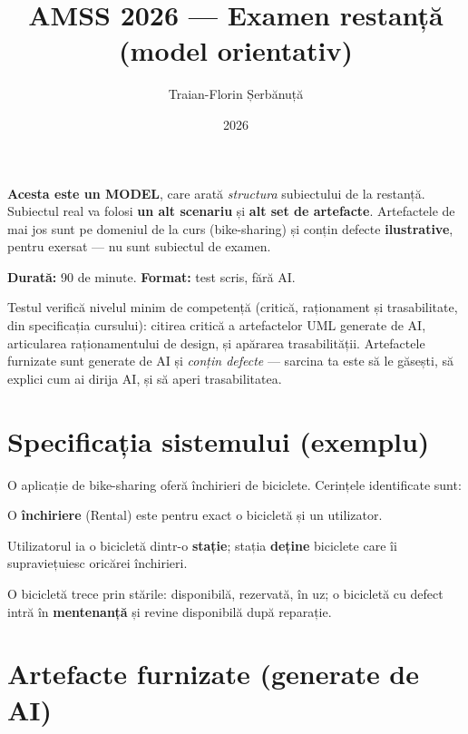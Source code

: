 \documentclass[12pt,a4paper]{article}
\title{AMSS 2026 — Examen restanță \\ \large (model orientativ)}
\author{Traian-Florin Șerbănuță}
\date{2026}
\begin{document}
\maketitle

\begin{framed}
\noindent\textbf{Acesta este un MODEL}, care arată \emph{structura}
subiectului de la restanță. Subiectul real va folosi \textbf{un alt
scenariu} și \textbf{alt set de artefacte}. Artefactele de mai jos sunt
pe domeniul de la curs (bike-sharing) și conțin defecte
\textbf{ilustrative}, pentru exersat — nu sunt subiectul de examen.
\end{framed}

\bigskip

\textbf{Durată:} 90 de minute. \textbf{Format:} test scris, fără AI.

\noindent Testul verifică nivelul minim de competență
(critică, raționament și trasabilitate, din specificația cursului): citirea critică a
artefactelor UML generate de AI, articularea raționamentului de design,
și apărarea trasabilității. Artefactele furnizate sunt generate de AI și
\emph{conțin defecte} — sarcina ta este să le găsești, să explici cum ai
dirija AI, și să aperi trasabilitatea.

\section*{Specificația sistemului (exemplu)}

O aplicație de bike-sharing oferă închirieri de biciclete. Cerințele
identificate sunt:

\begin{description}[leftmargin=3.2em,style=nextline]
  \item[R1] O \textbf{închiriere} (Rental) este pentru exact o bicicletă
        și un utilizator.
  \item[R2] Utilizatorul ia o bicicletă dintr-o \textbf{stație}; stația
        \textbf{deține} biciclete care îi supraviețuiesc oricărei
        închirieri.
  \item[R3] O bicicletă trece prin stările: disponibilă, rezervată, în
        uz; o bicicletă cu defect intră în \textbf{mentenanță} și revine
        disponibilă după reparație.
\end{description}

\section*{Artefacte furnizate (generate de AI)}
\end{document}
